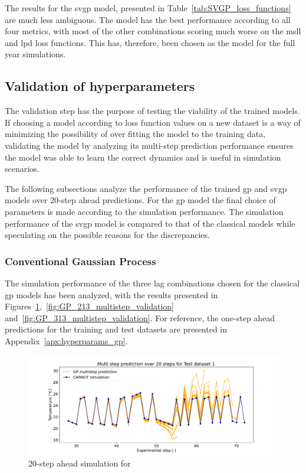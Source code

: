 The results for the \acrshort{svgp} model, presented in
Table~\ref{tab:SVGP_loss_functions} are much less ambiguous. The 
model has the best performance according to all four metrics, with most of the
other combinations scoring much worse on the \acrshort{msll} and \acrshort{lpd}
loss functions. This has, therefore, been chosen as the model for the full year
simulations.

\subsection{Validation of hyperparameters}\label{sec:validation_hyperparameters}

The validation step has the purpose of testing the viability of the trained
models. If choosing a model according to loss function values on a new dataset
is a way of minimizing the possibility of over fitting the model to the training
data, validating the model by analyzing its multi-step prediction performance
ensures the model was able to learn the correct dynamics and is useful in
simulation scenarios.

The following subsections analyze the performance of the trained \acrshort{gp}
and \acrshort{svgp} models over 20-step ahead predictions. For the \acrshort{gp}
model the final choice of parameters is made according to the simulation
performance. The simulation performance of the \acrshort{svgp} model is compared
to that of the classical models while speculating on the possible reasons for
the discrepancies.

\subsubsection{Conventional Gaussian Process}

The simulation performance of the three lag combinations chosen for the
classical \acrshort{gp} models has been analyzed, with the results presented in
Figures~\ref{fig:GP_113_multistep_validation},~\ref{fig:GP_213_multistep_validation}
and~\ref{fig:GP_313_multistep_validation}. For reference, the one-step ahead
predictions for the training and test datasets are presented in
Appendix~\ref{apx:hyperparams_gp}.


\begin{figure}[ht]
    \centering
    \includegraphics[width =
    \textwidth]{Plots/GP_113_-1pts_test_prediction_20_steps.pdf}
    \vspace{-25pt}
    \caption{20-step ahead simulation for }
    \label{fig:GP_113_multistep_validation}
\end{figure}

